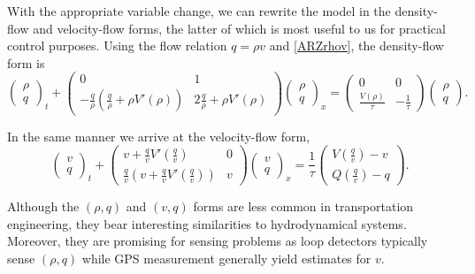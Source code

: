 \documentclass[preprint]{elsarticle}
\begin{document}
With the appropriate variable change, we can rewrite the model in the density-flow and velocity-flow forms, the latter of which is most useful to us for practical control purposes. Using the flow relation $q = \rho v$ and \eqref{ARZrhov}, the density-flow form is
\begin{equation} \label{ARZrhoq}
\begin{pmatrix}
\rho \\ q
\end{pmatrix}_t
+ \begin{pmatrix}
0 & 1 \\
-\frac{q}{\rho} \left(\frac{q}{\rho} + \rho V'(\rho) \right) & 2\frac{q}{\rho} + \rho V'(\rho) 
\end{pmatrix}
\begin{pmatrix}
\rho \\ q
\end{pmatrix}_x = 
\begin{pmatrix}
0 & 0 \\ 
\frac{V(\rho)}{\tau} & -\frac{1}{\tau}
\end{pmatrix} 
\begin{pmatrix}
\rho \\ q
\end{pmatrix}.
\end{equation}

In the same manner we arrive at the velocity-flow form,
\begin{equation} \label{ARZvq}
\begin{pmatrix}
v \\ q
\end{pmatrix}_t
+ \begin{pmatrix}
v + \frac{q}{v} V'\left(\frac{q}{v}\right) & 0 \\
\frac{q}{v} \left( v + \frac{q}{v} V'\left(\frac{q}{v}\right)\right) & v
\end{pmatrix}
\begin{pmatrix}
v \\ q
\end{pmatrix}_x = 
\dfrac{1}{\tau}
\begin{pmatrix}
V\left( \frac{q}{v}\right) - v \\
Q\left( \frac{q}{v}\right) - q
\end{pmatrix}.
\end{equation}

Although the $\left(\rho, q\right)$ and $\left(v, q\right)$ forms are less common in transportation engineering, they bear interesting similarities to hydrodynamical systems. Moreover, they are promising for sensing problems as loop detectors typically sense $\left(\rho, q\right)$ while GPS measurement generally yield estimates for $v$.
\end{document}
